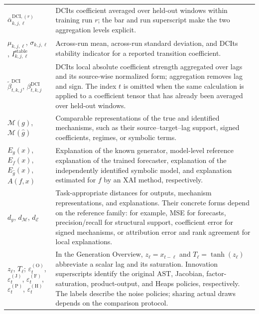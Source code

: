 \begin{longtable}{@{}
>{\raggedright\arraybackslash}p{}
>{\raggedright\arraybackslash}p{}@{}}
$\bar\alpha^{\mathrm{DCI},(r)}_{k,j,\ell}$ &
DCIts coefficient averaged over held-out windows within training run $r$; the
bar and run superscript make the two aggregation levels explicit. \\

$\mu_{k,j,\ell}$, $\sigma_{k,j,\ell}$,
$I^{\mathrm{stable}}_{k,j,\ell}$ &
Across-run mean, across-run standard deviation, and DCIts stability indicator
for a reported transition coefficient. \\

$\widetilde\beta^{\mathrm{DCI}}_{t,k,j}$,
$\beta^{\mathrm{DCI}}_{t,k,j}$ &
DCIts local absolute coefficient strength aggregated over lags and its
source-wise normalized form; aggregation removes lag and sign. The index $t$
is omitted when the same calculation is applied to a coefficient tensor that
has already been averaged over held-out windows. \\

$\mathcal M(g)$, $\mathcal M(\widehat g)$ &
Comparable representations of the true and identified mechanisms, such as
their source--target--lag support, signed coefficients, regimes, or symbolic
terms. \\

$E_g(x)$, $E_f(x)$, $E_{\widehat g}(x)$, $A(f,x)$ &
Explanation of the known generator, model-level reference explanation of the
trained forecaster, explanation of the independently identified symbolic
model, and explanation estimated for $f$ by an XAI method, respectively. \\

$d_y$, $d_{\mathcal M}$, $d_{\mathcal E}$ &
Task-appropriate distances for outputs, mechanism representations, and
explanations. Their concrete forms depend on the reference family: for
example, MSE for forecasts, precision/recall for structural support, coefficient
error for signed mechanisms, or attribution error and rank agreement for local
explanations. \\

$z_\ell$, $T_\ell$;
$\varepsilon_t^{(\mathrm O)}$, $\varepsilon_t^{(\mathrm J)}$,
$\varepsilon_t^{(\mathrm F)}$, $\varepsilon_t^{(\mathrm P)}$,
$\varepsilon_t^{(\mathrm H)}$ &
In the Generation Overview, $z_\ell=x_{t-\ell}$ and
$T_\ell=\tanh(z_\ell)$ abbreviate a scalar lag and its saturation.
Innovation superscripts identify the original AST, Jacobian, factor-saturation,
product-output, and Heaps policies, respectively. The labels describe the
noise policies; sharing actual draws depends on the comparison protocol. \\

\end{longtable}
\endgroup


